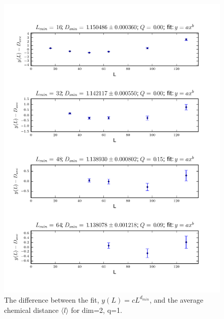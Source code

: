 \documentclass[pre,preprint]{revtex4}
\newcommand{\lb}{{\langle}}
\newcommand{\rb}{{\rangle}}
\begin{document}




\begin{figure}[htp]
\centering
\includegraphics[width=.85\textwidth]{figures/d_min_D2q1_46_fig}
\caption{The difference between the fit, $y(L)=cL^{d_{min}}$, and the average chemical distance $\lb l \rb$ for dim=2, q=1.}\label{fig:a}
\end{figure}

\end{document}
